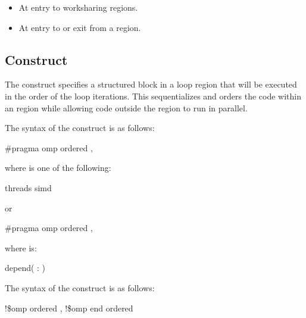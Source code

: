 \begin{itemize}
\item At entry to worksharing regions.

\item At entry to or exit from a  region.
\end{itemize}
\noteend










\subsection{ Construct}
\label{subsec:ordered Construct}
\summary
The  construct specifies a structured block in a loop region that will be 
executed in the order of the loop iterations. This sequentializes and orders the code 
within an  region while allowing code outside the region to run in parallel. 

\begin{samepage}
\syntax
\ccppspecificstart
The syntax of the  construct is as follows:

\begin{boxedcode}
\#pragma omp ordered \plc{[clause[ [},\plc{] clause] ... ]} 
\end{boxedcode}

where  is one of the following:
\begin{indentedcodelist}
threads
simd
\end{indentedcodelist}

or

\begin{boxedcode}
\#pragma omp ordered \plc{clause [[[},\plc{] clause] ... ]} 
\end{boxedcode}
where  is:
\begin{indentedcodelist}
depend( \plc{[}: \plc{vec]})
\end{indentedcodelist}


\ccppspecificend
\end{samepage}

\fortranspecificstart
The syntax of the  construct is as follows:

\begin{boxedcode}
!\$omp ordered \plc{[clause[ [},\plc{] clause] ... ]}
!\$omp end ordered
\end{boxedcode}

